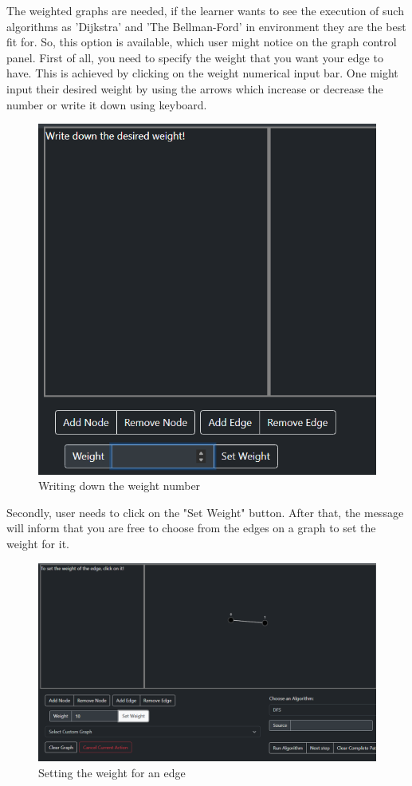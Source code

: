 The weighted graphs are needed, if the learner wants to see the execution of such algorithms as 'Dijkstra' and 'The Bellman-Ford' in environment they are the best fit for. So, this option is available, which user might notice on the graph control panel. First of all, you need to specify the weight that you want your edge to have. This is achieved by clicking on the weight numerical input bar. One might input their desired weight by using the arrows which increase or decrease the number or write it down using keyboard.

\begin{figure}[H]
	\centering
	\includegraphics[width=\textwidth]{images/writing_the_weight_number.png}
	\caption{Writing down the weight number}
\end{figure}

Secondly, user needs to click on the "Set Weight" button. After that, the message will inform that you are free to choose from the edges on a graph to set the weight for it.

\begin{figure}[H]
	\centering
	\includegraphics[width=\textwidth]{images/setting_the_weight_for_the_edge.png}
	\caption{Setting the weight for an edge}
\end{figure}

